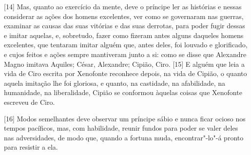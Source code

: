 {[}14{]} Mas, quanto ao exercício da mente, deve o príncipe ler as
histórias e nessas considerar as ações dos
homens excelentes, ver como se governaram nas guerras, examinar as
causas das suas vitórias e das suas derrotas, para poder fugir dessas e
imitar aquelas, e, sobretudo, fazer como fizeram antes alguns daqueles
homens excelentes, que tentaram imitar alguém que, antes deles, foi
louvado e glorificado, e cujos feitos e ações sempre mantiveram junto a
si: como se disse que Alexandre Magno imitava Aquiles; César, Alexandre;
Cipião, Ciro. {[}15{]} E alguém que leia
a vida de Ciro escrita por Xenofonte
reconhece depois, na vida de Cipião, o quanto aquela imitação lhe foi gloriosa, e
quanto, na castidade, na afabilidade, na humanidade, na liberalidade,
Cipião se conformou àquelas coisas que Xenofonte escreveu de Ciro.

{[}16{]} Modos semelhantes deve observar um príncipe sábio e nunca ficar
ocioso nos tempos pacíficos, mas, com habilidade, reunir fundos para
poder se valer deles nas adversidades, de modo que, quando a fortuna
muda, encontrar"-lo"-á pronto para resistir a ela.


